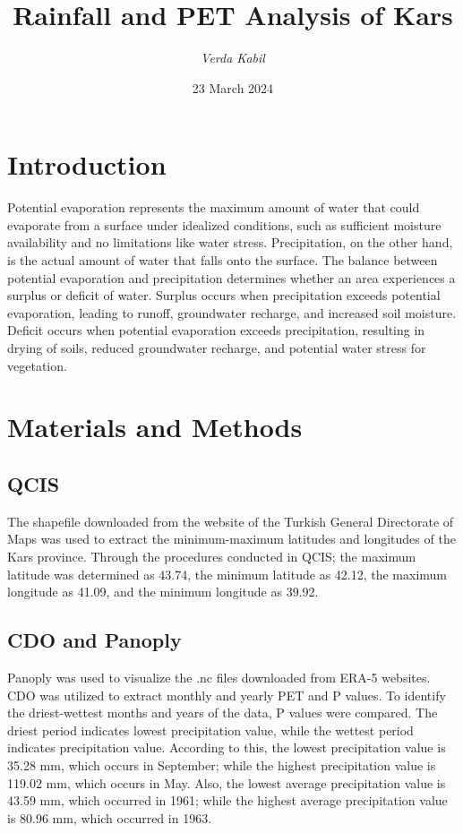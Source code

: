 \documentclass{article}
\title{Rainfall and PET Analysis of Kars}
\author{\textit{Verda Kabil}}
\date{23 March 2024}
\begin{document}
\maketitle

\date{}

\section{Introduction}

Potential evaporation represents the maximum amount of water that could evaporate from a surface under idealized conditions, such as sufficient moisture availability and no limitations like water stress. Precipitation, on the other hand, is the actual amount of water that falls onto the surface. The balance between potential evaporation and precipitation determines whether an area experiences a surplus or deficit of water. Surplus occurs when precipitation exceeds potential evaporation, leading to runoff, groundwater recharge, and increased soil moisture. Deficit occurs when potential evaporation exceeds precipitation, resulting in drying of soils, reduced groundwater recharge, and potential water stress for vegetation.


\section{Materials and Methods}

\subsection{QCIS}

The shapefile downloaded from the website of the Turkish General Directorate of Maps was used to extract the minimum-maximum latitudes and longitudes of the Kars province. Through the procedures conducted in QCIS; the maximum latitude was determined as 43.74, the minimum latitude as 42.12, the maximum longitude as 41.09, and the minimum longitude as 39.92.

\subsection{CDO and Panoply}

Panoply was used to visualize the .nc files downloaded from ERA-5 websites. CDO was utilized to extract monthly and yearly PET and P values. 
To identify the driest-wettest months and years of the data, P values were compared. The driest period indicates lowest precipitation value, while the wettest period indicates precipitation value. According to this, the lowest precipitation value is 35.28 mm, which occurs in September; while the highest precipitation value is 119.02 mm, which occurs in May. Also, the lowest average precipitation value is 43.59 mm, which occurred in 1961; while the highest average precipitation value is 80.96 mm, which occurred in 1963.
\end{document}
